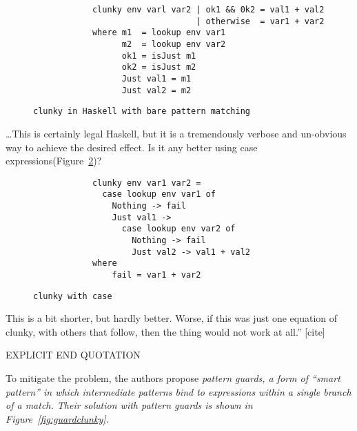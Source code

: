 \documentclass[manuscript,screen,review, 12pt]{acmart}
\begin{document}
\begin{outline}[enumerate]
    \begin{figure}[hbt!]
        \begin{verbatim}
            clunky env varl var2 | ok1 && 0k2 = val1 + val2 
                                 | otherwise  = var1 + var2 
            where m1  = lookup env var1 
                  m2  = lookup env var2
                  ok1 = isJust m1 
                  ok2 = isJust m2 
                  Just val1 = m1 
                  Just val2 = m2    
        \end{verbatim}
    \caption{\tt{clunky} in Haskell with bare pattern matching} 
    \label{fig:whereclunky}
    \end{figure}
        
    \dots This is certainly legal Haskell, but it is a tremendously verbose and
    un-obvious way to achieve the desired effect. Is it any better using case
    expressions(Figure~\ref{fig:caseclunky})?

    
    \begin{figure}[hbt!]
        \begin{verbatim}
            clunky env var1 var2 = 
              case lookup env var1 of 
                Nothing -> fail 
                Just val1 -> 
                  case lookup env var2 of 
                    Nothing -> fail 
                    Just val2 -> val1 + val2
            where 
                fail = var1 + var2
        \end{verbatim}
    \caption{\tt{clunky} with \tt{case}} 
    \label{fig:caseclunky}
    \end{figure}
    
        This is a bit shorter, but hardly better. Worse, if this was just one
        equation of clunky, with others that follow, then the thing would not
        work at all.” [cite]

        EXPLICIT END QUOTATION 

        To mitigate the problem, the authors propose \it{pattern guards}, a form
        of “smart pattern” in which intermediate patterns bind to
        expressions within a single branch of a match. Their solution with
        pattern guards is shown in Figure~\ref{fig:guardclunky}. 


\end{outline}
\end{document}
